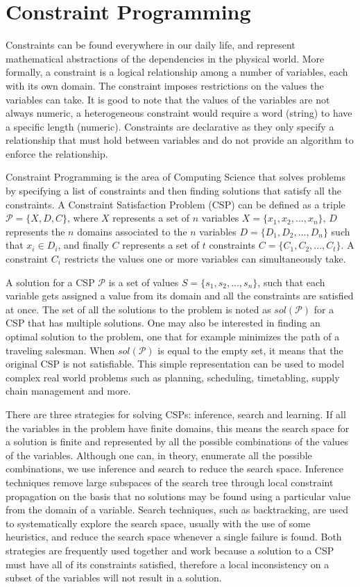 \documentclass{l4proj}
\begin{document}
\section{Constraint Programming}
\noindent Constraints can be found everywhere in our daily life, and represent mathematical abstractions of the dependencies in the physical world. More formally, a constraint is a logical relationship among a number of variables, each with its own domain. The constraint imposes restrictions on the values the variables can take. It is good to note that the values of the variables are not always numeric, a heterogeneous constraint would require a word (string) to have a specific length (numeric). Constraints are declarative as they only specify a relationship that must hold between variables and do not provide an algorithm to enforce the relationship.

\noindent Constraint Programming is the area of Computing Science that solves problems by specifying a list of constraints and then finding solutions that satisfy all the constraints. A Constraint Satisfaction Problem (CSP) can be defined as a triple $\mathcal{P} = \{X, D, C\}$, where $X$ represents a set of $n$ variables $X = \{x_1, x_2,..., x_n\}$, $D$ represents the $n$ domains associated to the $n$ variables $D = \{D_1, D_2,..., D_n\}$  such that $x_i \in D_i$, and finally $C$ represents a set of $t$ constraints $C =  \{C_1, C_2,..., C_t\}$. A constraint $C_i$ restricts the values one or more variables can simultaneously take.

\noindent A solution for a CSP $\mathcal{P}$ is a set of values $S = \{s_1, s_2,..., s_n\}$, such that each variable gets assigned a value from its domain and all the constraints are satisfied at once. The set of all the solutions to the problem is noted as $sol(\mathcal{P})$ for a CSP that has multiple solutions. One may also be interested in finding an optimal solution to the problem, one that for example minimizes the path of a traveling salesman. When $sol(\mathcal{P})$ is equal to the empty set, it means that the original CSP is not satisfiable. This simple representation can be used to model complex real world problems such as planning, scheduling, timetabling, supply chain management and more.

\noindent There are three strategies for solving CSPs: inference, search and learning. If all the variables in the problem have finite domains, this means the search space for a solution is finite and represented by all the possible combinations of the values of the variables. Although one can, in theory, enumerate all the possible combinations, we use inference and search to reduce the search space. Inference techniques remove large subspaces of the search tree through local constraint propagation on the basis that no solutions may be found using a particular value from the domain of a variable. Search techniques, such as backtracking, are used to systematically explore the search space, usually with the use of some heuristics, and reduce the search space whenever a single failure is found. Both strategies are frequently used together and work because a solution to a CSP must have all of its constraints satisfied, therefore a local inconsistency on a subset of the variables will not result in a solution.
\end{document}
